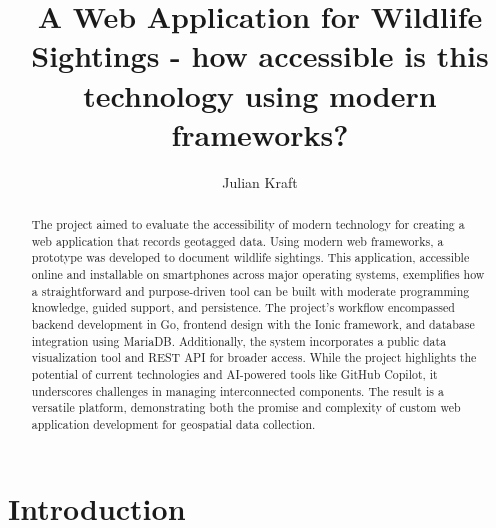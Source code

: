 \documentclass{josis}
\begin{document}


\title{A Web Application for Wildlife Sightings - how accessible is this technology using modern frameworks?}

\author{Julian Kraft}

\maketitle


\begin{abstract}

The project aimed to evaluate the accessibility of modern technology for creating a web application 
that records geotagged data. Using modern web frameworks, a prototype was developed to document wildlife sightings. 
This application, accessible online and installable on smartphones across major operating systems, 
exemplifies how a straightforward and purpose-driven tool can be built with moderate programming knowledge, 
guided support, and persistence. The project's workflow encompassed backend development in Go, 
frontend design with the Ionic framework, and database integration using MariaDB. Additionally, 
the system incorporates a public data visualization tool and REST API for broader access. 
While the project highlights the potential of current technologies and AI-powered tools like GitHub Copilot, 
it underscores challenges in managing interconnected components. The result is a versatile platform, 
demonstrating both the promise and complexity of custom web application development for geospatial data collection.

\end{abstract}

\section{Introduction}
\end{document}
